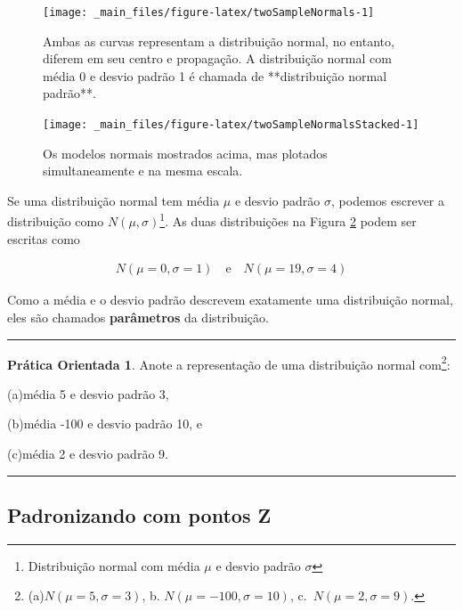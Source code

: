 \documentclass[
]{book}
\theoremstyle{definition}
\theoremstyle{definition}
\theoremstyle{definition}
\newtheorem{exercise}{Prática Orientada}[chapter]
\theoremstyle{definition}
\theoremstyle{remark}
\begin{document}
\begin{figure}
\texttt{[image: \_main\_files/figure-latex/twoSampleNormals-1]} \caption{Ambas as curvas representam a distribuição normal, no entanto, diferem em seu centro e propagação. A distribuição normal com média 0 e desvio padrão 1 é chamada de **distribuição normal padrão**.}\label{fig:twoSampleNormals}
\end{figure}

\begin{figure}
\texttt{[image: \_main\_files/figure-latex/twoSampleNormalsStacked-1]} \caption{Os modelos normais mostrados acima, mas plotados simultaneamente e na mesma escala.}\label{fig:twoSampleNormalsStacked}
\end{figure}

Se uma distribuição normal tem média \(\mu\) e desvio padrão \(\sigma\), podemos escrever a distribuição como \(N(\mu, \sigma)\)\footnote{Distribuição normal com média \(\mu\) e desvio padrão \(\sigma\)}. As duas distribuições na Figura \ref{fig:twoSampleNormalsStacked} podem ser escritas como

\begin{align*}
N(\mu=0,\sigma=1)\quad\text{e}\quad N(\mu=19,\sigma=4)
\end{align*}

Como a média e o desvio padrão descrevem exatamente uma distribuição normal, eles são chamados \textbf{parâmetros} da distribuição.

\begin{center}\rule{0.5\linewidth}{0.5pt}\end{center}

\begin{exercise}
\protect\hypertarget{exr:unnamed-chunk-84}{}{\label{exr:unnamed-chunk-84} }Anote a representação de uma distribuição normal com\footnote{(a)\(N(\mu=5,\sigma=3)\), b. \(N(\mu=-100, \sigma=10)\), c.~\(N(\mu=2, \sigma=9)\).}:

(a)média 5 e desvio padrão 3,

(b)média -100 e desvio padrão 10, e

(c)média 2 e desvio padrão 9.
\end{exercise}

\begin{center}\rule{0.5\linewidth}{0.5pt}\end{center}

\hypertarget{patterningZPoints}{%
\subsection{Padronizando com pontos Z}\label{patterningZPoints}}
\end{document}
